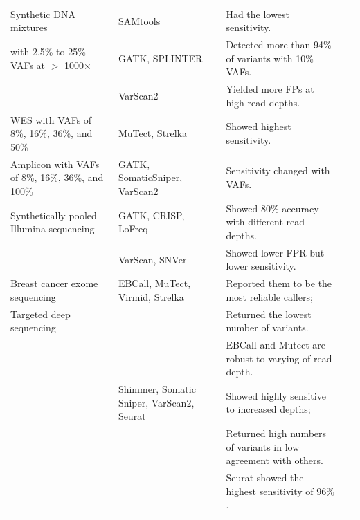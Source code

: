 \documentclass[a4,center,fleqn]{NAR}
\begin{document}
\begin{landscape}
\begin{table}[htbp]
\begin{threeparttable}
\begin{tabular}{rlrr}
    \midrule
    \multicolumn{1}{l}{Synthetic DNA mixtures } & SAMtools & \multicolumn{1}{l}{Had the lowest sensitivity.} &~\citep{Spencer2014}\\
    \multicolumn{1}{l}{with 2.5\% to 25\% VAFs at $>$ 1000$\times$ } & GATK,  SPLINTER & \multicolumn{1}{l}{Detected more than 94\% of variants with 10\% VAFs.} &  \\
          & VarScan2 & \multicolumn{1}{l}{Yielded more FPs at high read depths.} &  \\

    \midrule
    \multicolumn{1}{l}{WES with VAFs of 8\%, 16\%, 36\%, and 50\%} & MuTect, Strelka & \multicolumn{1}{l}{Showed highest sensitivity.} &~\citep{Xu2014}\\
    \multicolumn{1}{l}{Amplicon with VAFs of 8\%, 16\%, 36\%, and 100\%} & GATK, SomaticSniper, VarScan2 & \multicolumn{1}{l}{Sensitivity changed with VAFs.} &  \\

    \midrule
    \multicolumn{1}{l}{Synthetically pooled Illumina sequencing} & GATK, CRISP, LoFreq & \multicolumn{1}{l}{Showed 80\% accuracy with different read depths.} &~\citep{Huang2015} \\
          & VarScan, SNVer  & \multicolumn{1}{l}{Showed lower FPR but lower sensitivity.} &  \\
          
    \midrule
    \multicolumn{1}{l}{Breast cancer exome sequencing} & EBCall, MuTect, Virmid, Strelka & \multicolumn{1}{l}{Reported them to be the most reliable callers;} &~\citep{kroigaard2016evaluation} \\
    \multicolumn{1}{l}{Targeted deep sequencing} & & \multicolumn{1}{l}{Returned the lowest number of variants.} & \\
		&	& \multicolumn{1}{l}{EBCall and Mutect are robust to varying of read depth.} & \\
  		&  Shimmer, Somatic Sniper, VarScan2, Seurat & \multicolumn{1}{l}{Showed highly sensitive to increased depths;} &  \\
    		&	& \multicolumn{1}{l}{Returned high numbers of variants in low agreement with others.} & \\    
    		&	& \multicolumn{1}{l}{Seurat showed the highest sensitivity of $96\%$.} & \\            
        

\end{tabular}
\end{threeparttable}
\end{table}
\end{landscape}
\end{document}
